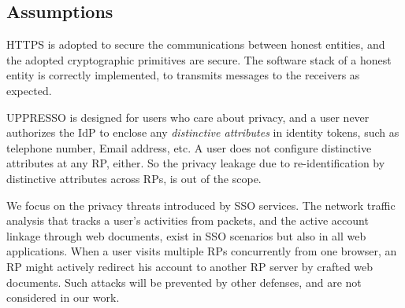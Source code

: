 
\subsection{Assumptions}
HTTPS is adopted to secure the communications between honest entities,
 and the adopted cryptographic primitives are secure.
The software stack of a honest entity is correctly implemented,
     to transmits messages to the receivers as expected.

UPPRESSO is designed for users who care about privacy,
and a user never authorizes the IdP to enclose any \emph{distinctive attributes} in identity tokens,
 such as telephone number, Email address, etc.
A user does not configure  distinctive attributes at any RP, either.
So the privacy leakage due to re-identification by distinctive attributes across RPs,
    is out of the scope.

We focus on the privacy threats introduced by SSO services.
The network traffic analysis that tracks a user's activities from packets,
    and the active account linkage through web documents,
        exist in SSO scenarios but also in all web applications.
When a user visits multiple RPs concurrently from one browser,
        an RP might actively redirect his account to another RP server by crafted web documents.
Such attacks will be prevented by other defenses,
    and are not considered in our work.




